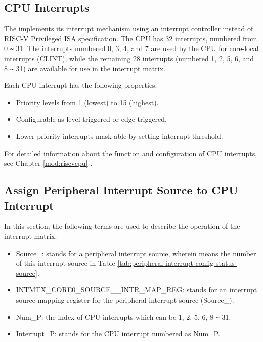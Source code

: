 \documentclass[main\_\_EN.tex]{subfiles}
\begin{document}
\subsection{CPU Interrupts}

The \chipname{} implements its interrupt mechanism using an interrupt controller instead of RISC-V Privileged ISA specification. The CPU has 32 interrupts, numbered from 0 \verb+~+ 31. The interrupts numbered 0, 3, 4, and 7 are used by the CPU for core-local interrupts (CLINT), while the remaining 28 interrupts (numbered 1, 2, 5, 6, and 8 \verb+~+ 31) are available for use in the interrupt matrix.

Each CPU interrupt has the following properties:
\begin{itemize}
    \item Priority levels from 1 (lowest) to 15 (highest).
    \item Configurable as level-triggered or edge-triggered.
    \item Lower-priority interrupts mask-able by setting interrupt threshold.
\end{itemize}

\begin{tiplisting}
For detailed information about the function and configuration of CPU interrupts, see Chapter \ref{mod:riscvcpu} \textit{}. 
\end{tiplisting}
\vspace{-1em}



\subsection{Assign Peripheral Interrupt Source to CPU Interrupt}

In this section, the following terms are used to describe the operation of the interrupt matrix.


\begin{itemize}

\item Source\_: stands for a peripheral interrupt source, wherein  means the number of this interrupt source in Table \ref{tab:peripheral-interrupt-config-status-source}.

\item INTMTX\_CORE0\_SOURCE\_\_INTR\_MAP\_REG: stands for an interrupt source mapping register for the peripheral interrupt source (Source\_).

\item Num\_P: the index of CPU interrupts which can be 1, 2, 5, 6, 8 \verb+~+ 31.
\item Interrupt\_P: stands for the CPU interrupt numbered as Num\_P.
\end{itemize}
\end{document}
